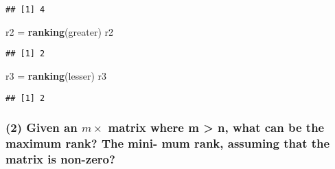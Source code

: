 \documentclass[]{article}
\newenvironment{Shaded}{\begin{snugshade}}{\end{snugshade}}
\newcommand{\KeywordTok}[1]{\textcolor[rgb]{0.13,0.29,0.53}{\textbf{#1}}}
\newcommand{\NormalTok}[1]{#1}
\newcommand{\StringTok}[1]{\textcolor[rgb]{0.31,0.60,0.02}{#1}}
\begin{document}
\begin{verbatim}
## [1] 4
\end{verbatim}

\begin{Shaded}
\begin{Highlighting}[]
\NormalTok{r2 =}\StringTok{ }\KeywordTok{ranking}\NormalTok{(greater)}
\NormalTok{r2}
\end{Highlighting}
\end{Shaded}

\begin{verbatim}
## [1] 2
\end{verbatim}

\begin{Shaded}
\begin{Highlighting}[]
\NormalTok{r3 =}\StringTok{ }\KeywordTok{ranking}\NormalTok{(lesser)}
\NormalTok{r3}
\end{Highlighting}
\end{Shaded}

\begin{verbatim}
## [1] 2
\end{verbatim}

\hypertarget{given-an-mtimes-matrix-where-m-n-what-can-be-the-maximum-rank-the-mini--mum-rank-assuming-that-the-matrix-is-non-zero}{%
\subsubsection{\texorpdfstring{(2) Given an \(m\times\) matrix where m
\textgreater{} n, what can be the maximum rank? The mini- mum rank,
assuming that the matrix is
non-zero?}{(2) Given an m\textbackslash times matrix where m \textgreater{} n, what can be the maximum rank? The mini- mum rank, assuming that the matrix is non-zero?}}\label{given-an-mtimes-matrix-where-m-n-what-can-be-the-maximum-rank-the-mini--mum-rank-assuming-that-the-matrix-is-non-zero}}
\end{document}
